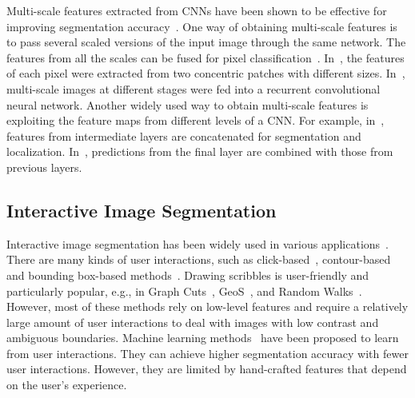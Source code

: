 \documentclass[10pt,journal,compsoc]{IEEEtran}
\begin{document}
Multi-scale features extracted from CNNs have been shown to be effective for improving segmentation accuracy~\cite{Long2014, Chen2015iclr,Onvolutions2016}. One way of obtaining multi-scale features is to pass several scaled versions of the input image through the same network. The features from all the scales can be fused for pixel classification~\cite{Lin2016cvpr_efficient}. %
 In~\cite{Havaei2016, Kamnitsas2017}, the features of each pixel were extracted from two concentric patches with different sizes. In~\cite{Pinheiro2014}, multi-scale images at different stages were fed into a recurrent convolutional neural network. Another widely used way to obtain multi-scale features is exploiting the feature maps from different levels of a CNN. For example, in~\cite{Hariharan2015}, features from intermediate layers are concatenated for segmentation and localization. In~\cite{Long2014, Chen2015iclr}, predictions from the final layer are combined with those from previous layers. %


\subsection{Interactive Image Segmentation}
Interactive image segmentation has been widely used in various applications~\cite{Armstrong2007,Cates2004,Rajchl2016}. There are many kinds of user interactions, such as click-based~\cite{Haider2015}, contour-based~\cite{Xu1998} and bounding box-based methods~\cite{Rother2004}. Drawing scribbles is user-friendly and particularly popular, e.g., in Graph Cuts~\cite{Boykov2001}, GeoS~\cite{Bai2007, Criminisi2008}, and Random Walks~\cite{Grady2006a}. %
However, most of these methods rely on low-level features and require a relatively large amount of user interactions to deal with images with low contrast and ambiguous boundaries. Machine learning methods~\cite{Barinova2012, Wang2016,Luengo2017} have been proposed to learn from user interactions. They can achieve higher segmentation accuracy with fewer user interactions. However, they are limited by hand-crafted features that depend on the user's experience.
\end{document}
